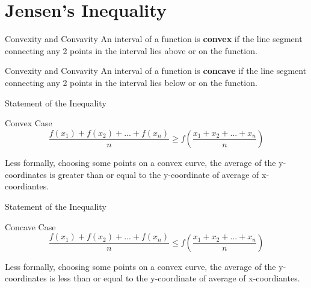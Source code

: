 \section{Jensen's Inequality}
\begin{namedframe}{Convexity and Convavity}
	An interval of a function is \textbf{convex} if the line segment connecting any 2 points in the interval lies above or on the function.
	\begin{center}\end{center}
\end{namedframe}

\begin{namedframe}{Convexity and Convavity}
	An interval of a function is \textbf{concave} if the line segment connecting any 2 points in the interval lies below or on the function.
	\begin{center}\end{center}
\end{namedframe}

\begin{namedframe}{Statement of the Inequality}
	\begin{block}{Convex Case}
		\[\frac{f(x_1) + f(x_2) + ... + f(x_n)}{n} \geq f \left( \frac{x_1 + x_2 + ... + x_n}{n} \right ) \]
	\end{block}

	Less formally, choosing some points on a convex curve, the average of the y-coordinates is greater than or equal to the
	y-coordinate of average of x-coordiantes.
\end{namedframe}

\begin{namedframe}{Statement of the Inequality}
	\begin{block}{Concave Case}
		\[\frac{f(x_1) + f(x_2) + ... + f(x_n)}{n} \leq f \left( \frac{x_1 + x_2 + ... + x_n}{n} \right ) \]
	\end{block}

	Less formally, choosing some points on a convex curve, the average of the y-coordinates is less than or equal to the
	y-coordinate of average of x-coordiantes.
\end{namedframe}

